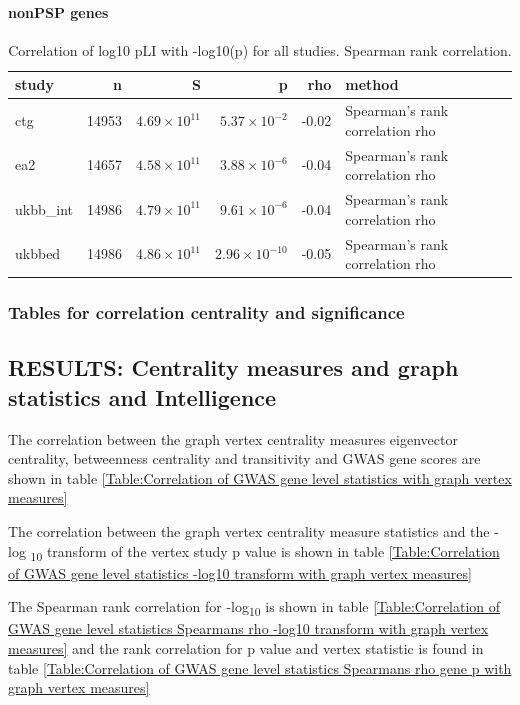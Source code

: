 \paragraph{nonPSP genes}
\begin{table}[ht]
\centering
\begin{tabular}{lrrrrl}
  \hline
study & n & S & p & rho & method \\ 
  \hline
ctg & 14953 & $4.69 \times 10^{11}$ & $5.37 \times 10^{-2}$ & -0.02 & Spearman's rank correlation rho \\ 
  ea2 & 14657 & $4.58 \times 10^{11}$ & $3.88 \times 10^{-6}$ & -0.04 & Spearman's rank correlation rho \\ 
  ukbb\_int & 14986 & $4.79 \times 10^{11}$ & $9.61 \times 10^{-6}$ & -0.04 & Spearman's rank correlation rho \\ 
  ukbbed & 14986 & $4.86 \times 10^{11}$ & $2.96 \times 10^{-10}$ & -0.05 & Spearman's rank correlation rho \\ 
   \hline
\end{tabular}
\caption{Correlation of log10 pLI with -log10(p) for all studies. Spearman rank correlation.} 
\label{tab:Correlation of log10 pLI with -log10(p) for all studies. Spearman rank correlation.}
\end{table}
\subsubsection{Tables for correlation centrality and significance}
\subsection{RESULTS: Centrality measures and graph statistics and Intelligence}

The correlation between the graph vertex centrality measures eigenvector centrality, betweenness centrality and transitivity and GWAS gene scores are shown in table \ref{Table:Correlation of GWAS gene level statistics with graph vertex measures}

The correlation between the graph vertex centrality measure statistics and the -log \textsubscript{10} transform of the vertex study p value is shown in table \ref{Table:Correlation of GWAS gene level statistics -log10 transform with graph vertex measures}

The Spearman rank correlation for -log\textsubscript{10} is shown in table \ref{Table:Correlation of GWAS gene level statistics Spearmans rho -log10 transform with graph vertex measures} and the rank correlation for p value and vertex statistic is found in table \ref{Table:Correlation of GWAS gene level statistics Spearmans rho gene p  with graph vertex measures} 

